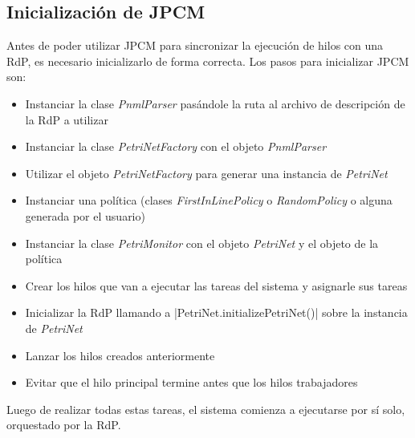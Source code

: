 \subsection{Inicialización de JPCM}
Antes de poder utilizar JPCM para sincronizar la ejecución de hilos con una
RdP, es necesario inicializarlo de forma correcta. Los pasos para inicializar
JPCM son:
\begin{itemize}
  \item Instanciar la clase \textit{PnmlParser} pasándole la ruta al archivo de
  descripción de la RdP a utilizar
  \item Instanciar la clase \textit{PetriNetFactory} con el objeto
  \textit{PnmlParser}
  \item Utilizar el objeto \textit{PetriNetFactory} para generar una instancia
  de \textit{PetriNet}
  \item Instanciar una política (clases \textit{FirstInLinePolicy} o
  \textit{RandomPolicy} o alguna generada por el usuario)
  \item Instanciar la clase \textit{PetriMonitor} con el objeto
  \textit{PetriNet} y el objeto de la política
  \item Crear los hilos que van a ejecutar las tareas del sistema y asignarle
  sus tareas
  \item Inicializar la RdP llamando a |PetriNet.initializePetriNet()|
  sobre la instancia de \textit{PetriNet}
  \item Lanzar los hilos creados anteriormente
  \item Evitar que el hilo principal termine antes que los hilos trabajadores
\end{itemize}
 
Luego de realizar todas estas tareas, el sistema comienza a ejecutarse por sí
solo, orquestado por la RdP.


